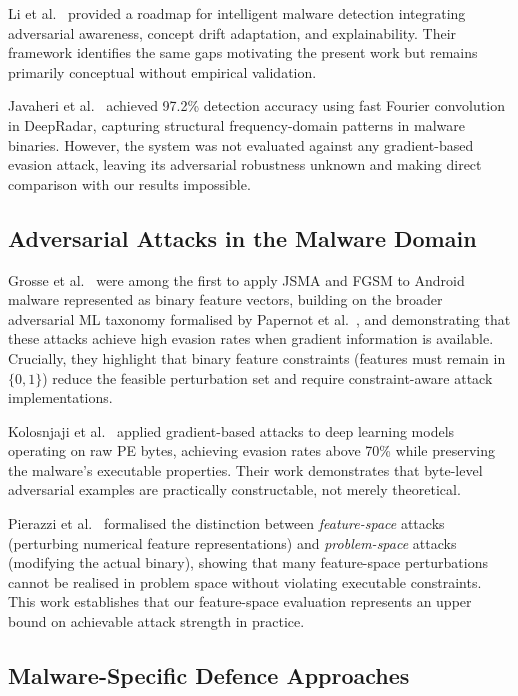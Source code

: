 \documentclass[conference]{IEEEtran}
\begin{document}
Li et al.\ \cite{li2021} provided a roadmap for intelligent malware detection integrating adversarial awareness, concept drift adaptation, and explainability. Their framework identifies the same gaps motivating the present work but remains primarily conceptual without empirical validation.

Javaheri et al.\ \cite{javaheri2025} achieved 97.2\% detection accuracy using fast Fourier convolution in DeepRadar, capturing structural frequency-domain patterns in malware binaries. However, the system was not evaluated against any gradient-based evasion attack, leaving its adversarial robustness unknown and making direct comparison with our results impossible.

\subsection{Adversarial Attacks in the Malware Domain}

Grosse et al.\ \cite{grosse2017} were among the first to apply JSMA and FGSM to Android malware represented as binary feature vectors, building on the broader adversarial ML taxonomy formalised by Papernot et al.\ \cite{papernot2017}, and demonstrating that these attacks achieve high evasion rates when gradient information is available. Crucially, they highlight that binary feature constraints (features must remain in $\{0,1\}$) reduce the feasible perturbation set and require constraint-aware attack implementations.

Kolosnjaji et al.\ \cite{kolosnjaji2018} applied gradient-based attacks to deep learning models operating on raw PE bytes, achieving evasion rates above 70\% while preserving the malware's executable properties. Their work demonstrates that byte-level adversarial examples are practically constructable, not merely theoretical.

Pierazzi et al.\ \cite{pierazzi2020} formalised the distinction between \emph{feature-space} attacks (perturbing numerical feature representations) and \emph{problem-space} attacks (modifying the actual binary), showing that many feature-space perturbations cannot be realised in problem space without violating executable constraints. This work establishes that our feature-space evaluation represents an upper bound on achievable attack strength in practice.

\subsection{Malware-Specific Defence Approaches}
\end{document}
